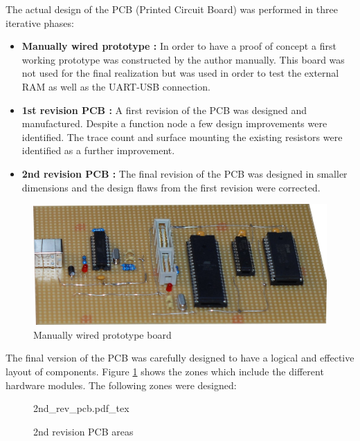 The actual design of the PCB (Printed Circuit Board) was performed in three iterative phases:
\begin{itemize}
\item \textbf{Manually wired prototype :} In order to have a proof of concept a first working prototype was constructed by the author manually. This board was not used for the final realization but was used in order to test the external RAM as well as the UART-USB connection.
\item \textbf{1st revision PCB :} A first revision of the PCB was designed and manufactured. Despite a function node a few design improvements were identified. The trace count and surface mounting the existing resistors were identified as a further improvement.
\item \textbf{2nd revision PCB :} The final revision of the PCB was designed in smaller dimensions and the design flaws from the first revision were corrected.
\end{itemize}

\begin{figure}[H]
\includegraphics[width=\textwidth]{figures/prototype_pcb.jpg}
\caption{Manually wired prototype board}
\end{figure}

The final version of the PCB was carefully designed to have a logical and effective layout of components. Figure \ref{fig:2ndrev_pcb} shows the zones which include the different hardware modules. The following zones were designed:

\begin{figure}[H]
    \centering
    {2nd_rev_pcb.pdf_tex}
    \caption{2nd revision PCB areas}
    \label{fig:2ndrev_pcb}
\end{figure}

